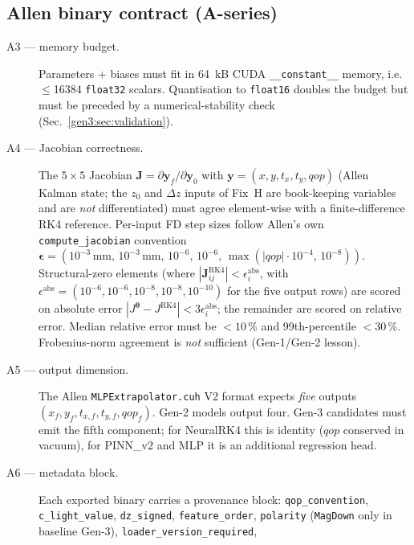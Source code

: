 \documentclass[a4paper,11pt]{article}
\newcommand{\SI}[2]{#1~#2}
\newcommand{\num}[1]{#1}
\newcommand{\kilo}{k}
\newcommand{\byte}{B}
\newcommand{\dz}{\Delta z}
\newcommand{\state}{\mathbf{y}}
\newcommand{\Jac}{\mathbf{J}}
\newcommand{\btheta}{\bm{\theta}}
\begin{document}
\subsection{Allen binary contract (A-series)}

\begin{description}
  \item[A3 --- memory budget.] Parameters + biases must fit in
        \SI{64}{\kilo\byte} CUDA \texttt{\_\_constant\_\_} memory,
        i.e.\ $\le$\num{16384} \texttt{float32} scalars.  Quantisation
        to \texttt{float16} doubles the budget but must be preceded
        by a numerical-stability check
        (Sec.~\ref{gen3:sec:validation}).
  \item[A4 --- Jacobian correctness.]  The $5\times 5$ Jacobian
        $\Jac = \partial\state_f/\partial\state_0$ with
        $\state = (x,y,t_x,t_y,qop)$ (Allen Kalman state;
        the $z_0$ and $\dz$ inputs of Fix~H are book-keeping
        variables and are \emph{not} differentiated) must agree
        element-wise with a finite-difference RK4 reference.
        Per-input FD step sizes follow Allen's own
        \texttt{compute\_jacobian} convention
        $\bm{\epsilon} = (10^{-3}\,\mathrm{mm},\,10^{-3}\,\mathrm{mm},\,10^{-6},\,10^{-6},\,\max(|qop|\cdot 10^{-4},\,10^{-8}))$.
        Structural-zero elements (where $|\Jac^\mathrm{RK4}_{ij}| <
        \epsilon^\mathrm{abs}_i$, with $\epsilon^\mathrm{abs} =
        (10^{-6},10^{-6},10^{-8},10^{-8},10^{-10})$ for the five
        output rows) are scored on absolute error $|J^{\btheta} -
        J^\mathrm{RK4}| < 3\epsilon^\mathrm{abs}_i$; the remainder
        are scored on relative error.  Median relative error must be
        $<10\,\%$ and 99th-percentile $<30\,\%$.  Frobenius-norm
        agreement is \emph{not} sufficient (Gen-1/Gen-2 lesson).
  \item[A5 --- output dimension.]  The Allen
        \texttt{MLPExtrapolator.cuh} V2 format expects \emph{five}
        outputs $(x_f,y_f,t_{x,f},t_{y,f},qop_{\!f})$.  Gen-2 models
        output four.  Gen-3 candidates must emit the fifth component;
        for NeuralRK4 this is identity ($qop$ conserved in vacuum),
        for PINN\_v2 and MLP it is an additional regression head.
  \item[A6 --- metadata block.] Each exported binary carries a
        provenance block: \texttt{qop\_convention},
        \texttt{c\_light\_value}, \texttt{dz\_signed},
        \texttt{feature\_order}, \texttt{polarity} (\texttt{MagDown}
        only in baseline Gen-3), \texttt{loader\_version\_required},

\end{description}
\end{document}

